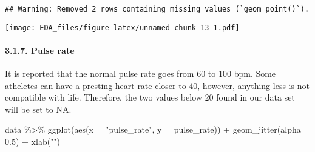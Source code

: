 \documentclass[
]{article}
\newenvironment{Shaded}{\begin{snugshade}}{\end{snugshade}}
\newcommand{\AttributeTok}[1]{\textcolor[rgb]{0.77,0.63,0.00}{#1}}
\newcommand{\CommentTok}[1]{\textcolor[rgb]{0.56,0.35,0.01}{\textit{#1}}}
\newcommand{\ConstantTok}[1]{\textcolor[rgb]{0.00,0.00,0.00}{#1}}
\newcommand{\DecValTok}[1]{\textcolor[rgb]{0.00,0.00,0.81}{#1}}
\newcommand{\FloatTok}[1]{\textcolor[rgb]{0.00,0.00,0.81}{#1}}
\newcommand{\FunctionTok}[1]{\textcolor[rgb]{0.00,0.00,0.00}{#1}}
\newcommand{\NormalTok}[1]{#1}
\newcommand{\OtherTok}[1]{\textcolor[rgb]{0.56,0.35,0.01}{#1}}
\newcommand{\SpecialCharTok}[1]{\textcolor[rgb]{0.00,0.00,0.00}{#1}}
\newcommand{\StringTok}[1]{\textcolor[rgb]{0.31,0.60,0.02}{#1}}
\begin{document}
\begin{Shaded}
\end{Shaded}

\begin{verbatim}
## Warning: Removed 2 rows containing missing values (`geom_point()`).
\end{verbatim}

\texttt{[image: EDA\_files/figure-latex/unnamed-chunk-13-1.pdf]}

\hypertarget{pulse-rate}{%
\paragraph{3.1.7. Pulse rate}\label{pulse-rate}}

It is reported that the normal pulse rate goes from
\href{https://www.bhf.org.uk/informationsupport/heart-matters-magazine/medical/ask-the-experts/pulse-rate}{60
to 100 bpm}. Some atheletes can have a
\href{https://my.clevelandclinic.org/health/diagnostics/17402-pulse--heart-rate}{presting
heart rate closer to 40}, however, anything less is not compatible with
life. Therefore, the two values below 20 found in our data set will be
set to NA.

\begin{Shaded}
\begin{Highlighting}[]
\NormalTok{data }\SpecialCharTok{\%\textgreater{}\%} 
  \FunctionTok{ggplot}\NormalTok{(}\FunctionTok{aes}\NormalTok{(}\AttributeTok{x =} \StringTok{"pulse\_rate"}\NormalTok{, }\AttributeTok{y =}\NormalTok{ pulse\_rate)) }\SpecialCharTok{+}
  \FunctionTok{geom\_jitter}\NormalTok{(}\AttributeTok{alpha =} \FloatTok{0.5}\NormalTok{) }\SpecialCharTok{+}
  \FunctionTok{xlab}\NormalTok{(}\StringTok{""}\NormalTok{)}
\end{Highlighting}
\end{Shaded}
\end{document}
